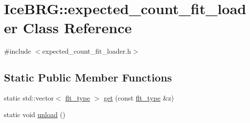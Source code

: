 \hypertarget{classIceBRG_1_1expected__count__fit__loader}{\section{Ice\-B\-R\-G\-:\-:expected\-\_\-count\-\_\-fit\-\_\-loader Class Reference}
\label{classIceBRG_1_1expected__count__fit__loader}
}


{\ttfamily \#include $<$expected\-\_\-count\-\_\-fit\-\_\-loader.\-h$>$}

\subsection*{Static Public Member Functions}
\begin{DoxyCompactItemize}
\item 
static std\-::vector$<$ \hyperlink{lib_2IceBRG__main_2common_8h_ad0f130a56eeb944d9ef2692ee881ecc4}{flt\-\_\-type} $>$ \hyperlink{classIceBRG_1_1expected__count__fit__loader_a98b772ace86125bcf96a843614981943}{get} (const \hyperlink{lib_2IceBRG__main_2common_8h_ad0f130a56eeb944d9ef2692ee881ecc4}{flt\-\_\-type} \&z)
\item 
static void \hyperlink{classIceBRG_1_1expected__count__fit__loader_a940c206daf47104618ff75efdf843a76}{unload} ()
\end{DoxyCompactItemize}


